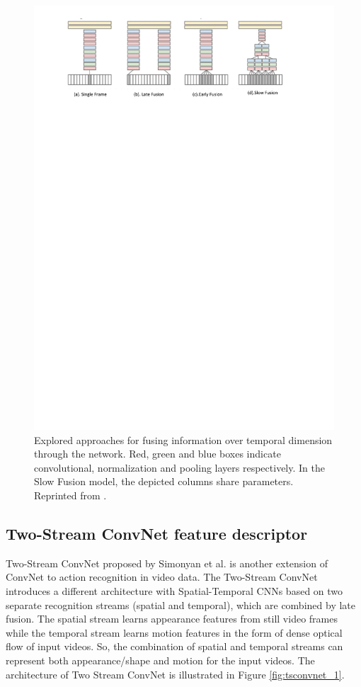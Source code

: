 \begin{figure}
	\includegraphics[trim=2cm 23cm 0cm 1cm]{figs/STCNNs.pdf}
	\caption{Explored approaches for fusing information over
		temporal dimension through the network. Red, green and
		blue boxes indicate convolutional, normalization and pooling
		layers respectively. In the Slow Fusion model, the depicted
		columns share parameters. Reprinted from \cite{karpathy2014}.}
	\label{fig:STCNNs}
\end{figure}

\subsection{Two-Stream ConvNet feature descriptor}
\label{2_3_2}
Two-Stream ConvNet proposed by Simonyan et al. \cite{simonyan2014} is another extension of ConvNet to action recognition in video data. The Two-Stream ConvNet introduces a different architecture with Spatial-Temporal CNNs \cite{karpathy2014} based on two separate recognition streams (spatial and temporal), which are combined by late fusion. The spatial stream learns appearance features from still video frames while the temporal stream learns motion features in the form of dense optical flow of input videos. So, the combination of spatial and temporal streams can represent both appearance/shape and motion for the input videos. The architecture of Two Stream ConvNet is illustrated in Figure \ref{fig:tsconvnet_1}.

